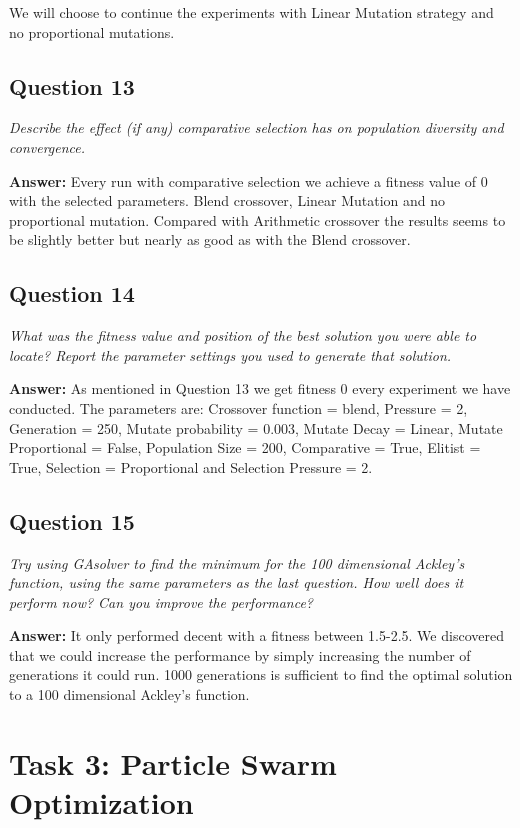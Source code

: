 \documentclass[a4paper]{article}
\begin{document}
We will choose to continue the experiments with Linear Mutation strategy and no proportional mutations. 

\subsection*{Question 13}
\emph{Describe the effect (if any) comparative selection has on population diversity and convergence.} 

\textbf{Answer:} Every run with comparative selection we achieve a fitness value of 0 with the selected parameters. Blend crossover, Linear Mutation and no proportional mutation. Compared with Arithmetic crossover the results seems to be slightly better but nearly as good as with the Blend crossover. 

\subsection*{Question 14}
\emph{What was the fitness value and position of the best solution you were
able to locate? Report the parameter settings you used to generate that
solution.} 

\textbf{Answer:} As mentioned in Question 13 we get fitness 0 every experiment
we have conducted. The parameters are: Crossover function = blend, Pressure =
2, Generation = 250, Mutate probability = 0.003, Mutate Decay = Linear, Mutate
Proportional = False, Population Size = 200, Comparative = True, Elitist =
True, Selection = Proportional and Selection Pressure = 2.

\subsection*{Question 15}
\emph{Try using GAsolver to find the minimum for the 100 dimensional Ackley's function, using the same parameters as the last question. How
well does it perform now? Can you improve the performance?} 

\textbf{Answer:} It only performed decent with a fitness between 1.5-2.5. We discovered that we could increase the performance by simply increasing the number of generations it could run. 1000 generations is sufficient to find the optimal solution to a 100 dimensional Ackley's function.

\section*{Task 3: Particle Swarm Optimization}
\end{document}
